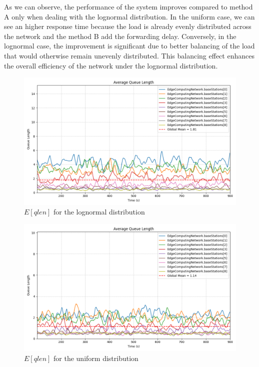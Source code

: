 \documentclass{report}
\begin{document}
As we can observe, the performance of the system improves compared to method A only when dealing with the lognormal distribution.
In the uniform case, we can see an higher response time because the load is already evenly distributed across the network and the method B add the forwarding delay.
Conversely, in the lognormal case, the improvement is significant due to better balancing of the load that would otherwise remain unevenly distributed.
This balancing effect enhances the overall efficiency of the network under the lognormal distribution.

\begin{figure}[H]
    \centering
    \includegraphics[width=\textwidth]{img/plots/log_1e3_B/qlen.png}
    \caption{$E[qlen]$ for the lognormal distribution}
\end{figure}

\begin{figure}[H]
    \centering
    \includegraphics[width=\textwidth]{img/plots/uni_1e3_B/qlen.png}
    \caption{$E[qlen]$ for the uniform distribution}
\end{figure}
\end{document}
